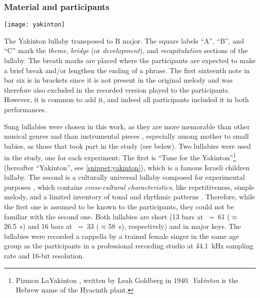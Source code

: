 \subsubsection{Material and participants}
\label{subsubsec:material_participants_music}

\begin{snippet}[t]
	\centering
	\texttt{[image: yakinton]}
	\caption[Yakinton lullaby]
		{The Yakinton lullaby transposed to B major.
		The square labels \enquote{A}, \enquote{B}, and \enquote{C} mark the \emph{theme}, \emph{bridge} (or \emph{development}), and \emph{recapitulation} sections of the lullaby.
		The breath marks are placed where the participants are expected to make a brief break and/or lengthen the ending of a phrase.
		The first sixteenth note in bar six is in brackets since it is not present in the original melody and was therefore also excluded in the recorded version played to the participants.
		However, it is common to add it, and indeed all participants included it in both performances.}
	\label{snippet:yakinton}
\end{snippet}
%
Sung lullabies were chosen in this work, as they are more memorable than other musical genres and than instrumental pieces \citep{Weiss2012something, Trehub1991music}, especially among mother to small babies, as those that took part in the study (see below).
Two lullabies were used in the study, one for each experiment: The first is \enquote{Tune for the Yakinton}\footnote{Pizmon LaYakinton
, written by Leah Goldberg in 1940. \emph{Yakinton} is the Hebrew name of the Hyacinth plant.} (hereafter \enquote{Yakinton}, see \cref{snippet:yakinton}), which is a famous Israeli children lullaby.
The second is a culturally universal lullaby composed for experimental purposes \citep[][pp.~22-47, and see \cref{snippet:uni-lullaby}]{Twig2016universal}, which contains \emph{cross-cultural characteristics}, like repetitiveness, simple melody, and a limited inventory of tonal and rhythmic patterns \citep{Unyk1992lullabies, Trehub1993maternal}.
Therefore, while the first one is assumed to be known to the participants, they could not be familiar with the second one.
Both lullabies are short (13 bars at \musQuarter~=~61 ($\approx$\SI{26.5}{\second}) and 16 bars at \musQuarterDotted~=~33 ($\approx$\SI{58}{\second}), respectively) and in major keys.
The lullabies were recorded a cappella by a trained female singer in the same age group as the participants in a professional recording studio at \SI{44.1}{\kilo\hertz} sampling rate and 16-bit resolution.
